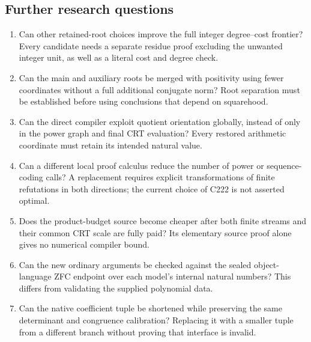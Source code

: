 \subsection{Further research questions}
\begin{enumerate}[leftmargin=*]
\item Can other retained-root choices improve the full integer degree--cost
frontier? Every candidate needs a separate residue proof excluding the
unwanted integer unit, as well as a literal cost and degree check.
\item Can the main and auxiliary roots be merged with positivity using
fewer coordinates without a full additional conjugate norm? Root separation
must be established before using conclusions that depend on squarehood.
\item Can the direct compiler exploit quotient orientation globally,
instead of only in the power graph and final CRT evaluation? Every
restored arithmetic coordinate must retain its intended natural value.
\item Can a different local proof calculus reduce the number of power
or sequence-coding calls? A replacement requires explicit transformations
of finite refutations in both directions; the current choice of C222 is
not asserted optimal.
\item Does the product-budget source become cheaper after both finite
streams and their common CRT scale are fully paid? Its elementary source
proof alone gives no numerical compiler bound.
\item Can the new ordinary arguments be checked against the sealed
object-language ZFC endpoint over each model's internal natural numbers?
This differs from validating the supplied polynomial data.
\item Can the native coefficient tuple be shortened while preserving the
same determinant and congruence calibration? Replacing it with a smaller
tuple from a different branch without proving that interface is invalid.
\end{enumerate}

